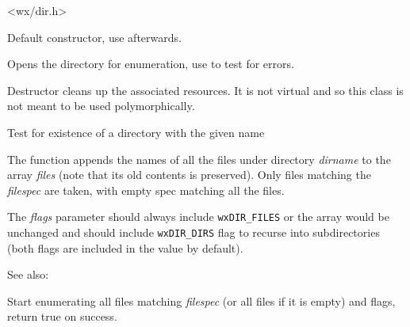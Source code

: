 
<wx/dir.h>


\label{wxdirwxdir}


Default constructor, use  afterwards.


Opens the directory for enumeration, use  
to test for errors.


\label{wxdirdtor}


Destructor cleans up the associated resources. It is not virtual and so this
class is not meant to be used polymorphically.


\label{wxdirexists}


Test for existence of a directory with the given name


\label{wxdirgetallfiles}


The function appends the names of all the files under directory {\it dirname} 
to the array {\it files} (note that its old contents is preserved). Only files
matching the {\it filespec} are taken, with empty spec matching all the files.

The {\it flags} parameter should always include {\tt wxDIR\_FILES} or the array
would be unchanged and should include {\tt wxDIR\_DIRS} flag to recurse into
subdirectories (both flags are included in the value by default).

See also: 


\label{wxdirgetfirst}


Start enumerating all files matching {\it filespec} (or all files if it is
empty) and flags, return true on success.


